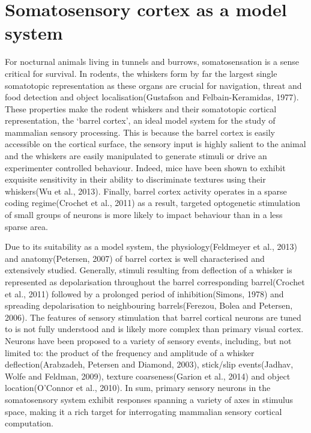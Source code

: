 \section{Somatosensory cortex as a model system}

For nocturnal animals living in tunnels and burrows, somatosensation is a sense critical for survival. In rodents, the whiskers form by far the largest single somatotopic representation as these organs are crucial for navigation, threat and food detection and object localisation(Gustafson and Felbain-Keramidas, 1977). These properties make the rodent whiskers and their somatotopic cortical representation, the ‘barrel cortex’, an ideal model system for the study of mammalian sensory processing. This is because the barrel cortex is easily accessible on the cortical surface, the sensory input is highly salient to the animal and the whiskers are easily manipulated to generate stimuli or drive an experimenter controlled behaviour. Indeed, mice have been shown to exhibit exquisite sensitivity in their ability to discriminate textures using their whiskers(Wu et al., 2013).  Finally, barrel cortex activity operates in a sparse coding regime(Crochet et al., 2011) as a result, targeted optogenetic stimulation of small groups of neurons is more likely to impact behaviour than in a less sparse area.

Due to its suitability as a model system, the physiology(Feldmeyer et al., 2013) and anatomy(Petersen, 2007) of barrel cortex is well characterised and extensively studied. Generally, stimuli resulting from deflection of a whisker is represented as depolarisation throughout the barrel corresponding barrel(Crochet et al., 2011) followed by a prolonged period of inhibition(Simons, 1978) and spreading depolarisation to neighbouring barrels(Ferezou, Bolea and Petersen, 2006). The features of sensory stimulation that barrel cortical neurons are tuned to is not fully understood and is likely more complex than primary visual cortex. Neurons have been proposed to a variety of sensory events, including, but not limited to: the product of the frequency and amplitude of a whisker deflection(Arabzadeh, Petersen and Diamond, 2003), stick/slip events(Jadhav, Wolfe and Feldman, 2009), texture coarseness(Garion et al., 2014) and object location(O’Connor et al., 2010).  In sum, primary sensory neurons in the somatosensory system exhibit responses spanning a variety of axes in stimulus space, making it a rich target for interrogating mammalian sensory cortical computation. 

